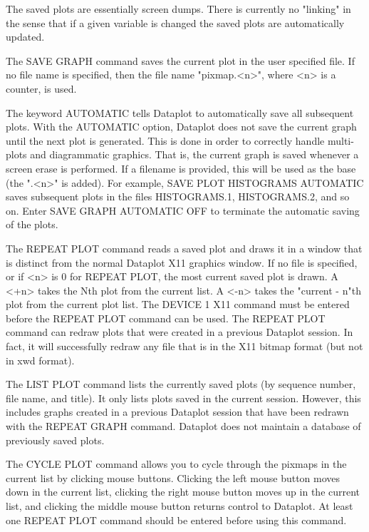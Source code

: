{    The saved plots are essentially screen dumps.  There is
    currently no "linking" in the sense that if a given variable
    is changed the saved plots are automatically updated.

    The SAVE GRAPH command saves the current plot in the user
    specified file.  If no file name is specified, then the file
    name "pixmap.<n>", where <n> is a counter, is used.

    The keyword AUTOMATIC tells Dataplot to automatically save all
    subsequent plots.  With the AUTOMATIC option, Dataplot does not
    save the current graph until the next plot is generated.  This is
    done in order to correctly handle multi-plots and diagrammatic
    graphics.  That is, the current graph is saved whenever a screen
    erase is performed.  If a filename is provided, this will be used
    as the base (the ".<n>" is added).  For example,
    SAVE PLOT HISTOGRAMS AUTOMATIC saves subsequent plots in
    the files HISTOGRAMS.1, HISTOGRAMS.2, and so on.  Enter SAVE GRAPH
    AUTOMATIC OFF to terminate the automatic saving of the plots.

    The REPEAT PLOT command reads a saved plot and draws it in a
    window that is distinct from the normal Dataplot X11 graphics
    window.  If no file is specified, or if <n> is 0 for REPEAT
    PLOT, the most current saved plot is drawn.  A <+n> takes the
    Nth plot from the current list.  A <-n> takes the "current - n"th
    plot from the current plot list.  The DEVICE 1 X11 command
    must be entered before the REPEAT PLOT command can be used.
    The REPEAT PLOT command can redraw plots that were created in
    a previous Dataplot session.  In fact, it will successfully
    redraw any file that is in the X11 bitmap format (but not in
    xwd format).

    The LIST PLOT command lists the currently saved plots (by
    sequence number, file name, and title).  It only lists plots
    saved in the current session.  However, this includes graphs
    created in a previous Dataplot session that have been redrawn
    with the REPEAT GRAPH command.  Dataplot does not maintain a
    database of previously saved plots.

    The CYCLE PLOT command allows you to cycle through the pixmaps
    in the current list by clicking mouse buttons.  Clicking the
    left mouse button moves down in the current list, clicking the
    right mouse button moves up in the current list, and clicking
    the middle mouse button returns control to Dataplot.  At least
    one REPEAT PLOT command should be entered before using this
    command.

}
